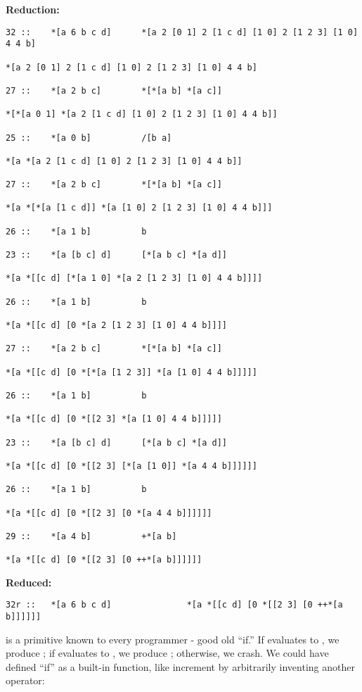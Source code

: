 \textbf{ Reduction:}

\begin{framed_shaded}
\begin{Verbatim}[fontsize=\relsize{-2.5},fontseries=b,commandchars=\\\{\}]
32 ::    *[a 6 b c d]      *[a 2 [0 1] 2 [1 c d] [1 0] 2 [1 2 3] [1 0] 4 4 b]

*[a 2 [0 1] 2 [1 c d] [1 0] 2 [1 2 3] [1 0] 4 4 b]

27 ::    *[a 2 b c]        *[*[a b] *[a c]]

*[*[a 0 1] *[a 2 [1 c d] [1 0] 2 [1 2 3] [1 0] 4 4 b]]

25 ::    *[a 0 b]          /[b a]

*[a *[a 2 [1 c d] [1 0] 2 [1 2 3] [1 0] 4 4 b]]

27 ::    *[a 2 b c]        *[*[a b] *[a c]]

*[a *[*[a [1 c d]] *[a [1 0] 2 [1 2 3] [1 0] 4 4 b]]]

26 ::    *[a 1 b]          b

23 ::    *[a [b c] d]      [*[a b c] *[a d]]

*[a *[[c d] [*[a 1 0] *[a 2 [1 2 3] [1 0] 4 4 b]]]]

26 ::    *[a 1 b]          b

*[a *[[c d] [0 *[a 2 [1 2 3] [1 0] 4 4 b]]]]

27 ::    *[a 2 b c]        *[*[a b] *[a c]]

*[a *[[c d] [0 *[*[a [1 2 3]] *[a [1 0] 4 4 b]]]]]

26 ::    *[a 1 b]          b

*[a *[[c d] [0 *[[2 3] *[a [1 0] 4 4 b]]]]]

23 ::    *[a [b c] d]      [*[a b c] *[a d]]

*[a *[[c d] [0 *[[2 3] [*[a [1 0]] *[a 4 4 b]]]]]]

26 ::    *[a 1 b]          b

*[a *[[c d] [0 *[[2 3] [0 *[a 4 4 b]]]]]]

29 ::    *[a 4 b]          +*[a b]

*[a *[[c d] [0 *[[2 3] [0 ++*[a b]]]]]]
\end{Verbatim}
\end{framed_shaded}

\textbf{ Reduced:}
\begin{framed_shaded}
\begin{Verbatim}[fontsize=\relsize{-2.5},fontseries=b,commandchars=\\\{\}]
	32r ::   *[a 6 b c d]               *[a *[[c d] [0 *[[2 3] [0 ++*[a b]]]]]]
\end{Verbatim}
\end{framed_shaded}
 is a primitive known to every programmer - good old ``if.''  If  evaluates
to , we produce ; if  evaluates to , we produce ; otherwise, we
crash. We could have defined ``if'' as a built-in function, like increment
by arbitrarily inventing another operator:

